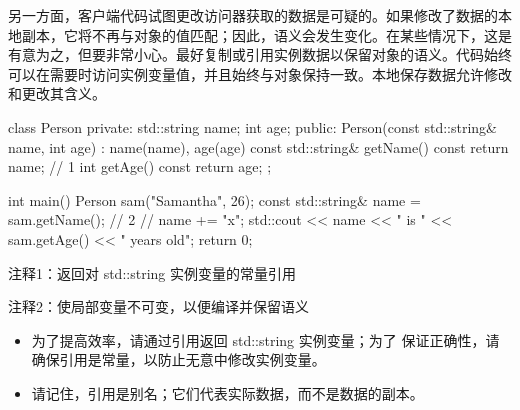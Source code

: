 另一方面，客户端代码试图更改访问器获取的数据是可疑的。如果修改了数据的本地副本，它将不再与对象的值匹配；因此，语义会发生变化。在某些情况下，这是有意为之，但要非常小心。最好复制或引用实例数据以保留对象的语义。代码始终可以在需要时访问实例变量值，并且始终与对象保持一致。本地保存数据允许修改和更改其含义。


\begin{cpp}
class Person {
private:
  std::string name;
  int age;
public:
  Person(const std::string& name, int age) : name(name), age(age) {}
  const std::string& getName() const { return name; } // 1
  int getAge() const { return age; }
};

int main() {
  Person sam("Samantha", 26);
  const std::string& name = sam.getName(); // 2
  // name += "x";
  std::cout << name << " is " << sam.getAge() << " years old\n";
  return 0;
}
\end{cpp}

{\footnotesize
注释1：返回对 std::string 实例变量的常量引用

注释2：使局部变量不可变，以便编译并保留语义
}


\begin{itemize}
\item
为了提高效率，请通过引用返回 std::string 实例变量；为了 保证正确性，请确保引用是常量，以防止无意中修改实例变量。

\item
请记住，引用是别名；它们代表实际数据，而不是数据的副本。
\end{itemize}




















